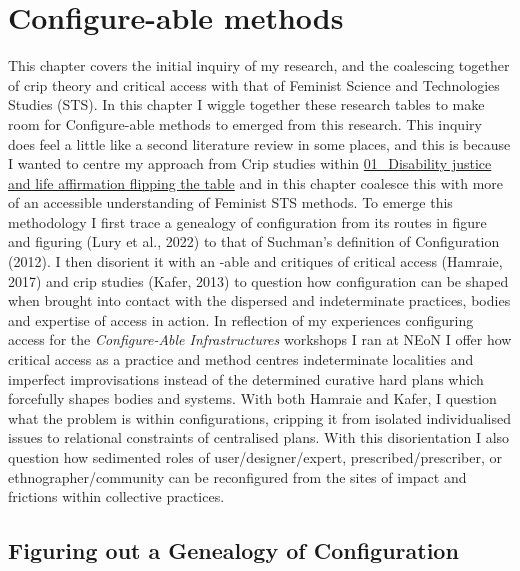 \hypertarget{configure-able-methods}{%
\section{Configure-able methods}\label{configure-able-methods}}

This chapter covers the initial inquiry of my research, and the
coalescing together of crip theory and critical access with that of
Feminist Science and Technologies Studies (STS). In this chapter I
wiggle together these research tables to make room for Configure-able
methods to emerged from this research. This inquiry does feel a little
like a second literature review in some places, and this is because I
wanted to centre my approach from Crip studies within
\href{../../01_Disability_justice_and_life_affirmation_flipping_the_table/01_Disability\%20justice\%20and\%20life\%20affirmation\%20flipping\%20the\%20table.md}{01\_Disability
justice and life affirmation flipping the table} and in this chapter
coalesce this with more of an accessible understanding of Feminist STS
methods. To emerge this methodology I first trace a genealogy of
configuration from its routes in figure and figuring (Lury et al., 2022)
to that of Suchman's definition of Configuration (2012). I then
disorient it with an -able and critiques of critical access (Hamraie,
2017) and crip studies (Kafer, 2013) to question how configuration can
be shaped when brought into contact with the dispersed and indeterminate
practices, bodies and expertise of access in action. In reflection of my
experiences configuring access for the \emph{Configure-Able
Infrastructures} workshops I ran at NEoN I offer how critical access as
a practice and method centres indeterminate localities and imperfect
improvisations instead of the determined curative hard plans which
forcefully shapes bodies and systems. With both Hamraie and Kafer, I
question what the problem is within configurations, cripping it from
isolated individualised issues to relational constraints of centralised
plans. With this disorientation I also question how sedimented roles of
user/designer/expert, prescribed/prescriber, or ethnographer/community
can be reconfigured from the sites of impact and frictions within
collective practices.

\hypertarget{figuring-out-a-genealogy-of-configuration}{%
\subsection{Figuring out a Genealogy of
Configuration}\label{figuring-out-a-genealogy-of-configuration}}

